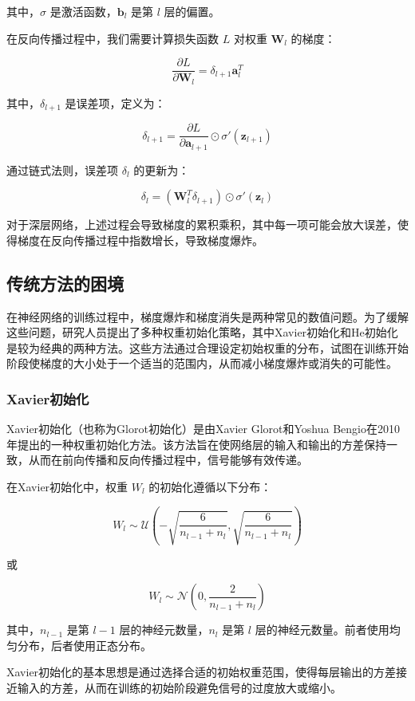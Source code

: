 \documentclass[12pt,a4paper]{amsart}
\begin{document}
其中，\(\sigma\) 是激活函数，\(\mathbf{b}_l\) 是第 \(l\) 层的偏置。

在反向传播过程中，我们需要计算损失函数 \(L\) 对权重 \(\mathbf{W}_l\) 的梯度：

\[ \frac{\partial L}{\partial \mathbf{W}_l} = \delta_{l+1} \mathbf{a}_l^T \]

其中，\(\delta_{l+1}\) 是误差项，定义为：

\[ \delta_{l+1} = \frac{\partial L}{\partial \mathbf{a}_{l+1}} \odot \sigma'(\mathbf{z}_{l+1}) \]

通过链式法则，误差项 \(\delta_l\) 的更新为：

\[ \delta_l = (\mathbf{W}_l^T \delta_{l+1}) \odot \sigma'(\mathbf{z}_l) \]

对于深层网络，上述过程会导致梯度的累积乘积，其中每一项可能会放大误差，使得梯度在反向传播过程中指数增长，导致梯度爆炸。

\subsection{传统方法的困境}

在神经网络的训练过程中，梯度爆炸和梯度消失是两种常见的数值问题。为了缓解这些问题，研究人员提出了多种权重初始化策略，其中Xavier初始化和He初始化是较为经典的两种方法。这些方法通过合理设定初始权重的分布，试图在训练开始阶段使梯度的大小处于一个适当的范围内，从而减小梯度爆炸或消失的可能性。

\subsubsection{Xavier初始化}

Xavier初始化（也称为Glorot初始化）是由Xavier Glorot和Yoshua Bengio在2010年提出的一种权重初始化方法。该方法旨在使网络层的输入和输出的方差保持一致，从而在前向传播和反向传播过程中，信号能够有效传递。

在Xavier初始化中，权重 \( W_l \) 的初始化遵循以下分布：

\[ W_l \sim \mathcal{U}\left(-\sqrt{\frac{6}{n_{l-1} + n_l}}, \sqrt{\frac{6}{n_{l-1} + n_l}}\right) \]

或

\[ W_l \sim \mathcal{N}\left(0, \frac{2}{n_{l-1} + n_l}\right) \]

其中，\( n_{l-1} \) 是第 \( l-1 \) 层的神经元数量，\( n_l \) 是第 \( l \) 层的神经元数量。前者使用均匀分布，后者使用正态分布。

Xavier初始化的基本思想是通过选择合适的初始权重范围，使得每层输出的方差接近输入的方差，从而在训练的初始阶段避免信号的过度放大或缩小。
\end{document}

